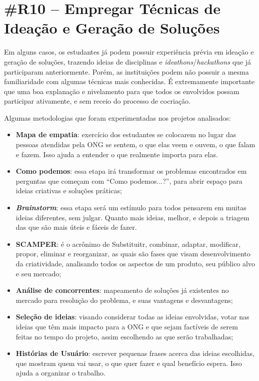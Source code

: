 \section*{\#R10 – Empregar Técnicas de Ideação e Geração de Soluções}

Em alguns casos, os estudantes já podem possuir experiência prévia em ideação e geração de soluções, trazendo ideias de disciplinas e \textit{ideathons}/\textit{hackathons} que já participaram anteriormente. Porém, as instituições podem não possuir a mesma familiaridade com algumas técnicas mais conhecidas. É extremamente importante que uma boa explanação e nivelamento para que todos os envolvidos possam participar ativamente, e sem receio do processo de cocriação.

Algumas metodologias que foram experimentadas nos projetos analisados:
\begin{itemize}
    \item \textbf{Mapa de empatia}: exercício dos estudantes se colocarem no lugar das pessoas atendidas pela ONG se sentem, o que elas veem e ouvem, o que falam e fazem. Isso ajuda a entender o que realmente importa para elas.
    \item \textbf{Como podemos}: essa etapa irá transformar os problemas encontrados em perguntas que começam com “Como podemos...?”, para abrir espaço para ideias criativas e soluções práticas;
    \item \textbf{\textit{Brainstorm}}: essa etapa será um estímulo para todos pensarem em muitas ideias diferentes, sem julgar. Quanto mais ideias, melhor, e depois a triagem das que são mais úteis e fáceis de fazer.
    \item \textbf{SCAMPER}: é o acrônimo de Substituitr, combinar, adaptar, modificar, propor, eliminar e reorganizar, as quais são fases que visam desenvolvimento da criatividade, analisando todos os aspectos de um produto, seu público alvo e seu mercado;
    \item \textbf{Análise de concorrentes}: mapeamento de soluções já existentes no mercado para resolução do problema, e suas vantagens e desvantagens;
    \item \textbf{Seleção de ideias}: visando considerar todas as ideias envolvidas,  votar nas ideias que têm mais impacto para a ONG e que sejam factíveis de serem feitas no tempo do projeto, assim escolhendo as que serão trabalhadas;
    \item \textbf{Histórias de Usuário}: escrever pequenas frases acerca das ideias escolhidas, que mostram quem vai usar, o que quer fazer e qual benefício espera. Isso ajuda a organizar o trabalho.
\end{itemize}

